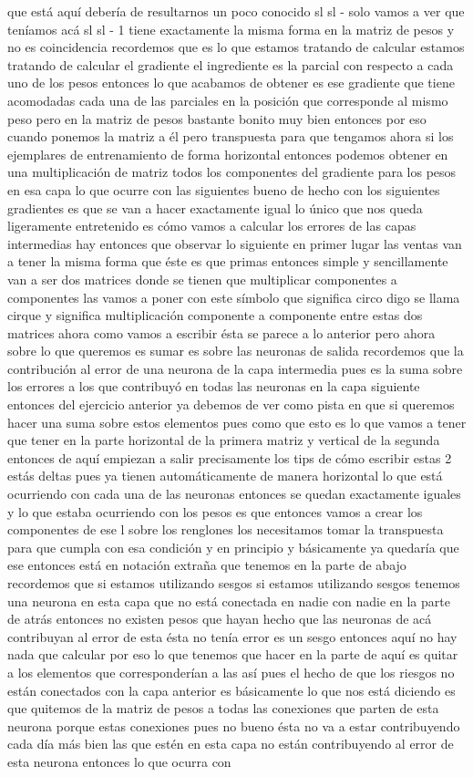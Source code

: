 que está aquí debería de resultarnos un poco conocido sl sl - solo vamos a ver que teníamos acá sl sl - 1 tiene exactamente la misma forma en la matriz de pesos y no es coincidencia recordemos que es lo que estamos tratando de calcular estamos tratando de calcular el gradiente el ingrediente es la parcial con respecto a cada uno de los pesos entonces lo que acabamos de obtener es ese gradiente que tiene acomodadas cada una de las parciales en la posición que corresponde al mismo peso pero en la matriz de pesos bastante bonito muy bien entonces por eso cuando ponemos la matriz a él pero transpuesta para que tengamos ahora si los ejemplares de entrenamiento de forma horizontal entonces podemos obtener en una multiplicación de matriz todos los componentes del gradiente para los pesos en esa capa lo que ocurre con las siguientes bueno de hecho con los siguientes gradientes es que se van a hacer exactamente igual lo único que nos queda ligeramente entretenido es cómo vamos a calcular los errores de las capas intermedias hay entonces que observar lo siguiente en primer lugar las ventas van a tener la misma forma que éste es que primas entonces simple y sencillamente van a ser dos matrices donde se tienen que multiplicar componentes a componentes las vamos a poner con este símbolo que significa circo digo se llama cirque y significa multiplicación componente a componente entre estas dos matrices ahora como vamos a escribir ésta se parece a lo anterior pero ahora sobre lo que queremos es sumar es sobre las neuronas de salida recordemos que la contribución al error de una neurona de la capa intermedia pues es la suma sobre los errores a los que contribuyó en todas las neuronas en la capa siguiente entonces del ejercicio anterior ya debemos de ver como pista en que si queremos hacer una suma sobre estos elementos pues como que esto es lo que vamos a tener que tener en la parte horizontal de la primera matriz y vertical de la segunda entonces de aquí empiezan a salir precisamente los tips de cómo escribir estas 2 estás deltas pues ya tienen automáticamente de manera horizontal lo que está ocurriendo con cada una de las neuronas entonces se quedan exactamente iguales y lo que estaba ocurriendo con los pesos es que entonces vamos a crear los componentes de ese l sobre los renglones los necesitamos tomar la transpuesta para que cumpla con esa condición y en principio y básicamente ya quedaría que ese entonces está en notación extraña que tenemos en la parte de abajo recordemos que si estamos utilizando sesgos si estamos utilizando sesgos tenemos una neurona en esta capa que no está conectada en nadie con nadie en la parte de atrás entonces no existen pesos que hayan hecho que las neuronas de acá contribuyan al error de esta ésta no tenía error es un sesgo entonces aquí no hay nada que calcular por eso lo que tenemos que hacer en la parte de aquí es quitar a los elementos que corresponderían a las así pues el hecho de que los riesgos no están conectados con la capa anterior es básicamente lo que nos está diciendo es que quitemos de la matriz de pesos a todas las conexiones que parten de esta neurona porque estas conexiones pues no bueno ésta no va a estar contribuyendo cada día más bien las que estén en esta capa no están contribuyendo al error de esta neurona entonces lo que ocurra con 